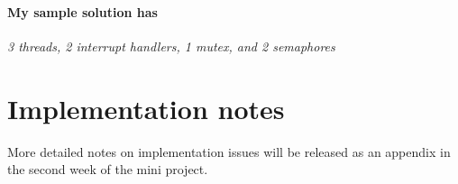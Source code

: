 \documentclass{article}
\begin{document}
\paragraph{My sample solution has} \emph{3 threads, 2 interrupt handlers, 1
mutex, and 2 semaphores}


\section{Implementation notes}
More detailed notes on implementation issues will be released as an appendix
in the second week of the mini project.



\end{document}
